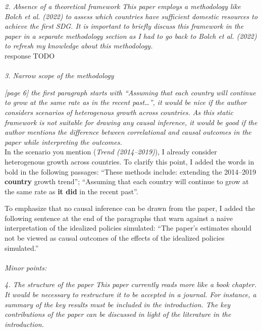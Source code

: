 \documentclass[12pt,english]{article}
\begin{document}
\textit{2.	Absence of a theoretical framework}
\textit{This paper employs a methodology like Bolch et al. (2022) to assess which countries have sufficient domestic resources to achieve the first SDG. It is important to briefly discuss this framework in the paper in a separate methodology section as I had to go back to Bolch et al. (2022) to refresh my knowledge about this methodology. }~\\

response TODO
~\\ ~\\

\textit{3.	Narrow scope of the methodology}

\textit{[page 6] the first paragraph starts with “Assuming that each country will continue to grow at the same rate as in the recent past…”, it would be nice if the author considers scenarios of heterogenous growth across countries. As this static framework is not suitable for drawing any causal inference, it would be good if the author mentions the difference between correlational and causal outcomes in the paper while interpreting the outcomes. }~\\

In the scenario you mention (\textit{Trend (2014--2019)}), I already consider heterogenous growth across countries. To clarify this point, I added the words in bold in the following passages: ``These methods include: extending the 2014--2019 \textbf{country} growth trend''; ``Assuming that each country will continue to grow at the same rate as \textbf{it did} in the recent past''. 

To emphasize that no causal inference can be drawn from the paper, I added the following sentence at the end of the paragraphs that warn against a naive interpretation of the idealized policies simulated: ``The paper's estimates should not be viewed as causal outcomes of the effects of the idealized policies simulated.''
~\\ ~\\

\textit{Minor points:}
 
\textit{4.	The structure of the paper}
\textit{This paper currently reads more like a book chapter. It would be necessary to restructure it to be accepted in a journal. For instance, a summary of the key results must be included in the introduction. The key contributions of the paper can be discussed in light of the literature in the introduction.}~\\
\end{document}
